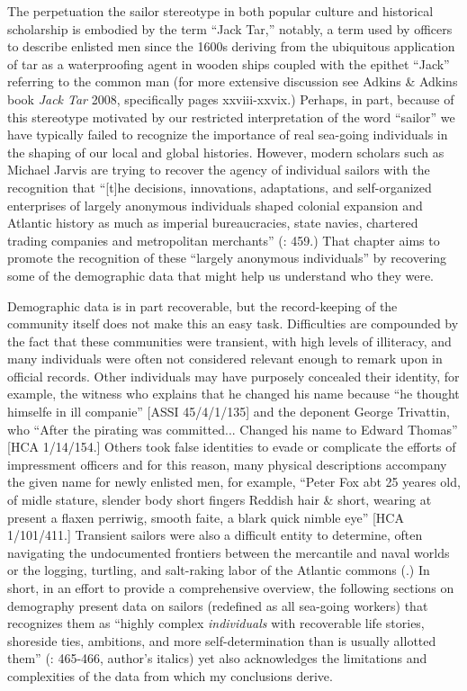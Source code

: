   The perpetuation the sailor stereotype in both popular culture and historical scholarship is embodied by the term “Jack Tar,” notably, a term used by officers to describe enlisted men since the 1600s deriving from the ubiquitous application of tar as a waterproofing agent in wooden ships coupled with the epithet “Jack” referring to the common man (for more extensive discussion see Adkins \& Adkins book \textit{Jack Tar} 2008, specifically pages xxviii-xxvix.) Perhaps, in part, because of this stereotype motivated by our restricted interpretation of the word “sailor” we have typically failed to recognize the importance of real sea-going individuals in the shaping of our local and global histories. However, modern scholars such as Michael Jarvis are trying to recover the agency of individual sailors with the recognition that “[t]he decisions, innovations, adaptations, and self-organized enterprises of largely anonymous individuals shaped colonial expansion and Atlantic history as much as imperial bureaucracies, state navies, chartered trading companies and metropolitan merchants” (\citealt{Jarvis2010}: 459.) That chapter aims to promote the recognition of these “largely anonymous individuals” by recovering some of the demographic data that might help us understand who they were. 

Demographic data is in part recoverable, but the record-keeping of the community itself does not make this an easy task. Difficulties are compounded by the fact that these communities were transient, with high levels of illiteracy, and many individuals were often not considered relevant enough to remark upon in official records. Other individuals may have purposely concealed their identity, for example, the witness who explains that he changed his name because “he thought himselfe in ill companie” [ASSI 45/4/1/135] and the deponent George Trivattin, who “After the pirating was committed... Changed his name to Edward Thomas” [HCA 1/14/154.] Others took false identities to evade or complicate the efforts of impressment officers and for this reason, many physical descriptions accompany the given name for newly enlisted men, for example, “Peter Fox abt 25 yeares old, of midle stature, slender body short fingers Reddish hair \& short, wearing at present a flaxen perriwig, smooth faite, a blark quick nimble eye” [HCA 1/101/411.] Transient sailors were also a difficult entity to determine, often navigating the undocumented frontiers between the mercantile and naval worlds \citep{Fusaro2015} or the logging, turtling, and salt-raking labor of the Atlantic commons (\citealt{Jarvis2010}.) In short, in an effort to provide a comprehensive overview, the following sections on demography present data on sailors (redefined as all sea-going workers) that recognizes them as “highly complex \textit{individuals} with recoverable life stories, shoreside ties, ambitions, and more self-determination than is usually allotted them” (\citealt{Jarvis2010}: 465-466, author’s italics) yet also acknowledges the limitations and complexities of the data from which my conclusions derive. 

